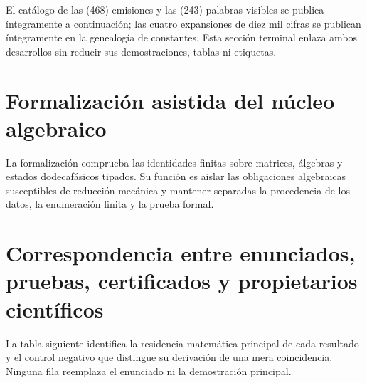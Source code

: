 El catálogo de las (468) emisiones y las (243) palabras visibles se publica
íntegramente a continuación; las cuatro expansiones de diez mil cifras se
publican íntegramente en la genealogía de constantes. Esta sección terminal
enlaza ambos desarrollos sin reducir sus demostraciones, tablas ni etiquetas.

\begin{HMTScientificOwnerSubordinated}

\end{HMTScientificOwnerSubordinated}




\chapter{Formalización asistida del núcleo algebraico}
\label{app:formalizacion-asistida-acumulativa}

La formalización comprueba las identidades finitas sobre matrices, álgebras y
estados dodecafásicos tipados. Su función es aislar las obligaciones
algebraicas susceptibles de reducción mecánica y mantener separadas la
procedencia de los datos, la enumeración finita y la prueba formal.

\HMTDemoteHeadings

\HMTRestoreHeadings

\chapter{Correspondencia entre enunciados, pruebas, certificados y propietarios científicos}
\label{app:indice-resultados-fuentes-acumulativo}

La tabla siguiente identifica la residencia matemática principal de cada
resultado y el control negativo que distingue su derivación de una mera
coincidencia. Ninguna fila reemplaza el enunciado ni la demostración principal.

